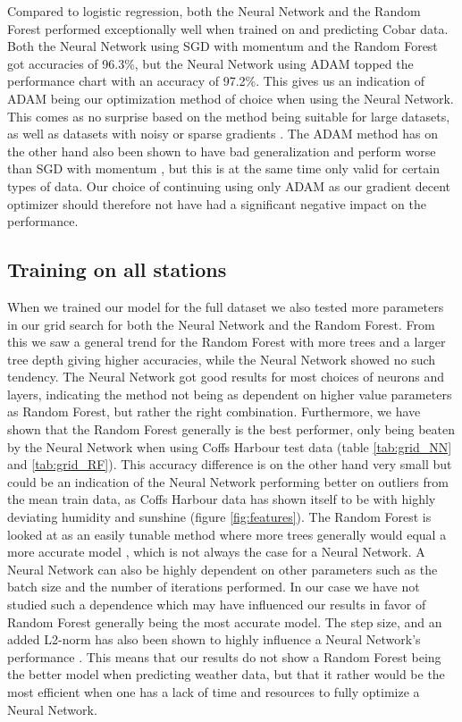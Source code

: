 \documentclass[11pt]{article}
\begin{document}
Compared to logistic regression, both the Neural Network and the Random Forest performed exceptionally well when trained on and predicting Cobar data. Both the Neural Network using SGD with momentum and the Random Forest got accuracies of 96.3\%, but the Neural Network using ADAM topped the performance chart with an accuracy of 97.2\%. This gives us an indication of ADAM being our optimization method of choice when using the Neural Network. This comes as no surprise based on the method being suitable for large datasets, as well as datasets with noisy or sparse gradients \cite{kingma2014adam}. The ADAM method has on the other hand also been shown to have bad generalization and perform worse than SGD with momentum \cite{SGD}, but this is at the same time only valid for certain types of data. Our choice of continuing using only ADAM as our gradient decent optimizer should therefore not have had a significant negative impact on the performance.

\subsection{Training on all stations} %
\label{sub:Training on all stations}

When we trained our model for the full dataset we also tested more parameters in our grid search for both the Neural Network and the Random Forest. From this we saw a general trend for the Random Forest with more trees and a larger tree depth giving higher accuracies, while the Neural Network showed no such tendency. The Neural Network got good results for most choices of neurons and layers, indicating the method not being as dependent on higher value parameters as Random Forest, but rather the right combination. Furthermore, we have shown that the Random Forest generally is the best performer, only being beaten by the Neural Network when using Coffs Harbour test data (table \ref{tab:grid_NN} and \ref{tab:grid_RF}). This accuracy difference is on the other hand very small but could be an indication of the Neural Network performing better on outliers from the mean train data, as Coffs Harbour data has shown itself to be with highly deviating humidity and sunshine (figure \ref{fig:features}). The Random Forest is looked at as an easily tunable method where more trees generally would equal a more accurate model \cite{probst2017tune}, which is not always the case for a Neural Network. A Neural Network can also be highly dependent on other parameters such as the batch size and the number of iterations performed. In our case we have not studied such a dependence which may have influenced our results in favor of Random Forest generally being the most accurate model. The step size, and an added L2-norm has also been shown to highly influence a Neural Network's performance \cite{project2}. This means that our results do not show a Random Forest being the better model when predicting weather data, but that it rather would be the most efficient when one has a lack of time and resources to fully optimize a Neural Network.
\end{document}

